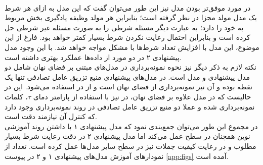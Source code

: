 \\
در مورد موفق‌تر بودن مدل \sentigan{} نیز این طور می‌توان گفت که این مدل به ازای هر شرط یک مدل مولد مجزا در نظر گرفته است؛ بنابراین هر مولد وظیفه یادگیری بخش مربوط به خود را دارد؛ به عبارت دیگر مسئله شرطی را به صورت مسئله غیر شرطی حل کرده است و بنابراین احتمال رعایت نکردن شرط بسیار کمتر خواهد بود. فارغ از این موضوع، این مدل با افزایش تعداد شرط‌ها با مشکل مواجه خواهد شد. با این وجود مدل پیشنهادی ۲ در دو مورد از داده‌ها عملکرد بهتری داشته است.
\\
نکته لازم به ذکر دیگر نیز نحوه نمونه‌برداری در مدل‌های مبتنی بر فضای نهان شامل دو مدل پیشنهادی و مدل \towardctg{} است. در مدل‌های پیشنهادی منبع تزریق عامل تصادفی تنها یک نقطه بوده و آن نیز نمونه‌برداری از فضای نهان است و از \greedydecoding{} در \decoder{} استفاده می‌شود. این در حالیست که در مدل \towardctg{} علاوه بر فضای نهان، در \decoder{} نیز با استفاده از پارامتر دمای $\tau$، کلمات نمونه‌برداری شده و عملا دو منبع تزریق عامل تصادفی در روند نمونه‌برداری وجود دارد که کنترل آن نیازمند دقت است.
\\
در مجموع این طور می‌توان جمع‌بندی نمود که مدل پیشنهادی ۱ با داشتن روند آموزشی نوین همچنان در سطح \towardctg{} عمل می‌کند اما مدل پیشنهادی ۲ در دقت رعایت شرط بسیار مطلوب و در رعایت کیفیت جملات نیز در سطح سایر مدل‌ها عمل کرده است. تعداد از نمودار‌های آموزش مدل‌های پیشنهادی ۱ و ۲ در پیوست \ref{app:figs} آمده است.

\iffalse
